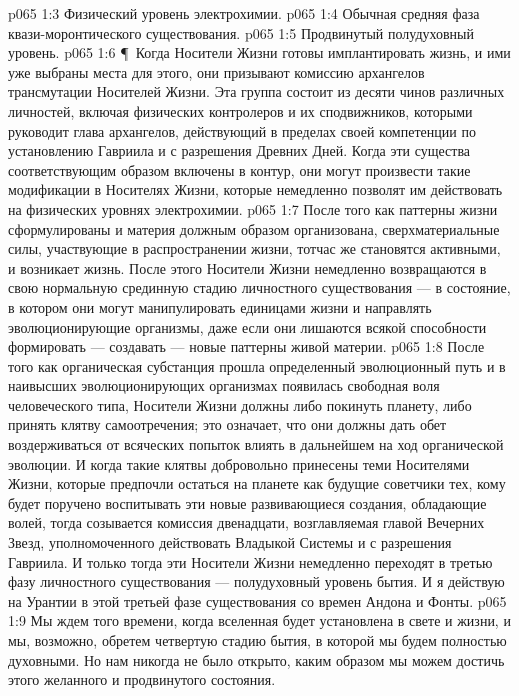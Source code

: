 \vs p065 1:3 \bibnobreakspace Физический уровень электрохимии.
\vs p065 1:4 \bibnobreakspace Обычная средняя фаза квази\hyp{}моронтического существования.
\vs p065 1:5 \bibnobreakspace Продвинутый полудуховный уровень.
\vs p065 1:6 \P\ Когда Носители Жизни готовы имплантировать жизнь, и ими уже выбраны места для этого, они призывают комиссию архангелов трансмутации Носителей Жизни. Эта группа состоит из десяти чинов различных личностей, включая физических контролеров и их сподвижников, которыми руководит глава архангелов, действующий в пределах своей компетенции по установлению Гавриила и с разрешения Древних Дней. Когда эти существа соответствующим образом включены в контур, они могут произвести такие модификации в Носителях Жизни, которые немедленно позволят им действовать на физических уровнях электрохимии.
\vs p065 1:7 После того как паттерны жизни сформулированы и материя должным образом организована, сверхматериальные силы, участвующие в распространении жизни, тотчас же становятся активными, и возникает жизнь. После этого Носители Жизни немедленно возвращаются в свою нормальную срединную стадию личностного существования --- в состояние, в котором они могут манипулировать единицами жизни и направлять эволюционирующие организмы, даже если они лишаются всякой способности формировать --- создавать --- новые паттерны живой материи.
\vs p065 1:8 После того как органическая субстанция прошла определенный эволюционный путь и в наивысших эволюционирующих организмах появилась свободная воля человеческого типа, Носители Жизни должны либо покинуть планету, либо принять клятву самоотречения; это означает, что они должны дать обет воздерживаться от всяческих попыток влиять в дальнейшем на ход органической эволюции. И когда такие клятвы добровольно принесены теми Носителями Жизни, которые предпочли остаться на планете как будущие советчики тех, кому будет поручено воспитывать эти новые развивающиеся создания, обладающие волей, тогда созывается комиссия двенадцати, возглавляемая главой Вечерних Звезд, уполномоченного действовать Владыкой Системы и с разрешения Гавриила. И только тогда эти Носители Жизни немедленно переходят в третью фазу личностного существования --- полудуховный уровень бытия. И я действую на Урантии в этой третьей фазе существования со времен Андона и Фонты.
\vs p065 1:9 Мы ждем того времени, когда вселенная будет установлена в свете и жизни, и мы, возможно, обретем четвертую стадию бытия, в которой мы будем полностью духовными. Но нам никогда не было открыто, каким образом мы можем достичь этого желанного и продвинутого состояния.
